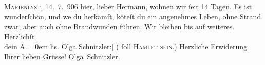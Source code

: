 \begin{ledgroupsized}[t]{13cm}
           \pstart
           \textsc{{\pb}Marienlyst}, 14. 7. 906\pend
           \pstart
           hier, lieber Hermann, wohnen wir ſeit 14 Tagen. Es ist wunderſchön,
               und we{\geminationn} du herkämſt, kö{\geminationn}teſt du ein angenehmes Leben, ohne Strand zwar, aber auch ohne Brandwunden führen.
               Wir bleiben bis auf weiteres.\pend
           \pstart
           Herzlichſt{\\[\baselineskip]}dein \spacefill\mbox{A.}\pend
           \leftskip=0em{}\pstart
           \noindent{}{\pb}{[}hs. Olga Schnitzler:{]} (\label{T_L01612_1v}\label{T_L01612_1h} ſoll \textsc{Hamlet sein.})\pend
           \pstart Herzliche Erwiderung Ihrer lieben Grüsse! { }\spacefill\mbox{Olga Schnitzler.}\pend{}
         
         \endnumbering{}\end{ledgroupsized}  \newcommand{\dateiname}{L01612}\newcommand{\titel}{Arthur und Olga Schnitzler an Hermann Bahr, 14. 7. 1906}\newcommand{\editorInnen}{ Kurt Ifkovits,  Martin Anton Müller}
      